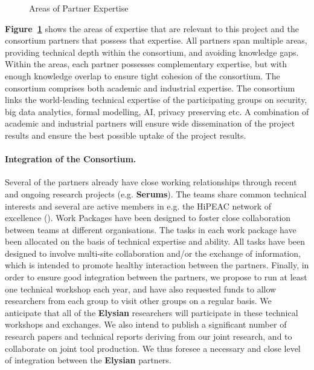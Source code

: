 \documentclass[a4paper,11pt]{article}
\newcommand{\project}[1]{\textbf{#1}\xspace}
\newcommand{\SECURITY}{\project{Elysian}}
\newcommand{\TheProject}{\SECURITY}
\begin{document}
\begin{figure}[t]
\begin{center}
\end{center}
\vspace{-0.3in}
\caption{Areas of Partner Expertise}
\label{fig:consortium}
\end{figure}

\textbf{Figure~\ref{fig:consortium}} shows the areas of expertise that
are relevant to this project and the consortium partners that
possess that expertise.  All partners span multiple areas,
providing technical depth within the consortium, and avoiding
knowledge gaps.  Within the areas, each partner possesses
complementary expertise, but with enough knowledge overlap to
ensure tight cohesion of the consortium. The consortium
comprises both academic and industrial expertise.
The consortium links the world-leading technical expertise of
the participating groups on security, big data analytics, formal modelling, AI, privacy preserving etc.
A combination of academic and industrial partners will ensure wide dissemination of the project results and ensure the best possible uptake of the project results.



\paragraph*{Integration of the Consortium.}

Several of the partners already have close working relationships through
recent and ongoing research projects (e.g. \textbf{Serums}).
The teams share common technical interests and several are active members in e.g. the
HiPEAC network of excellence (\SAshort{}).
Work Packages have been designed to foster close collaboration
between teams at different organisations.
The tasks in 
each work package have been allocated on the basis of
technical expertise and ability. All tasks have been designed to involve multi-site
collaboration and/or the exchange of information, which is
intended to promote healthy interaction between the partners.
Finally, in order to ensure good integration between the partners,
we propose to run at least one technical workshop each year, and
have also requested funds to allow researchers from each group
to visit other groups on a regular basis.  We anticipate that
all of the \TheProject{} researchers will participate in these
technical workshops and exchanges.  We also intend to publish a significant
number of research papers and technical reports deriving from our joint research,
and to collaborate on joint tool production. 
We thus foresee a necessary and close level of integration between
the \TheProject{} partners.
\end{document}

